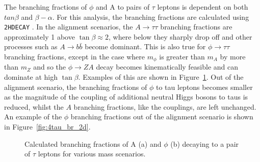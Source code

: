 The branching fractions of $\phi$ and A to pairs of $\tau$ leptons is dependent on both $tan\beta$ and $\beta-\alpha$.
For this analysis, the branching fractions are calculated using \texttt{2HDECAY} \cite{Krause:2018wmo}.
In the alignment scenarios, the $A\rightarrow\tau\tau$ branching fractions are approximately 1 above $\tan\beta \approx 2$, where below they sharply drop off and other processes such as $A\rightarrow b\bar{b}$ become dominant.
This is also true for $\phi\rightarrow\tau\tau$ branching fractions, except in the case where $m_\phi$ is greater than $m_A$ by more than $m_Z$ and so the $\phi\rightarrow ZA$ decay becomes kinematically feasible and can dominate at high $\tan\beta$.
Examples of this are shown in Figure~\ref{fig:4tau_br_1d}.
Out of the alignment scenario, the branching fractions of $\phi$ to tau leptons becomes smaller as the magnitude of the coupling of additional neutral Higgs bosons to taus is reduced, whilst the $A$ branching fractions, like the couplings, are left unchanged.
An example of the $\phi$ branching fractions out of the alignment scenario is shown in Figure~\ref{fig:4tau_br_2d}.

\begin{figure}[!hbtp]
\centering
\caption{Calculated branching fractions of A (a) and $\phi$ (b) decaying to a pair of $\tau$ leptons for various mass scenarios.}
\label{fig:4tau_br_1d}
\end{figure}

